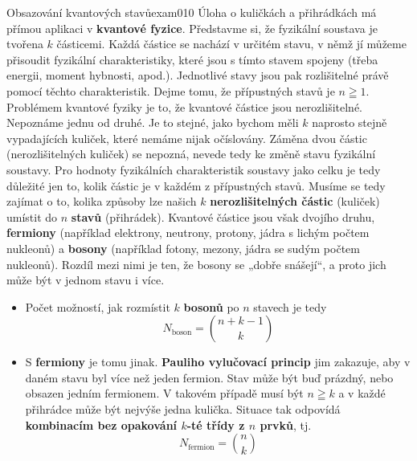 \begin{mathexam}{Obsazování kvantových stavů}{exam010}
  Úloha o kuličkách a přihrádkách má přímou aplikaci v \textbf{kvantové fyzice}. Představme si, že
  fyzikální soustava je tvořena \(k\) částicemi. Každá částice se nachází v určitém stavu, v němž jí
  můžeme přisoudit fyzikální charakteristiky, které jsou s tímto stavem spojeny (třeba energii,
  moment hybnosti, apod.). Jednotlivé stavy jsou pak rozlišitelné právě pomocí těchto
  charakteristik. Dejme tomu, že přípustných stavů je \(n \geqq 1\). Problémem kvantové fyziky je
  to, že kvantové částice jsou nerozlišitelné. Nepoznáme jednu od druhé. Je to stejné, jako bychom
  měli \(k\) naprosto stejně vypadajících kuliček, které nemáme nijak očíslovány. Záměna dvou částic
  (nerozlišitelných kuliček) se nepozná, nevede tedy ke změně stavu fyzikální soustavy. Pro hodnoty
  fyzikálních charakteristik soustavy jako celku je tedy důležité jen to, kolik částic je v každém z
  přípustných stavů. Musíme se tedy zajímat o to, kolika způsoby lze našich \(k\)
  \textbf{nerozlišitelných částic} (kuliček) umístit do \(n\) \textbf{stavů} (přihrádek). Kvantové
  částice jsou však dvojího druhu, \textbf{fermiony} (například elektrony, neutrony, protony, jádra
  s lichým počtem nukleonů) a \textbf{bosony} (například fotony, mezony, jádra se sudým počtem
  nukleonů). Rozdíl mezi nimi je ten, že bosony se „dobře snášejí“, a proto jich může být v jednom
  stavu i více. 
  \begin{itemize}[noitemsep]
    \item Počet možností, jak rozmístit \(k\) \textbf{bosonů} po \(n\) stavech je tedy
          \begin{equation*}
            N_{\text{boson}} = \binom{ n + k - 1}{k}
          \end{equation*}
    \item S \textbf{fermiony} je tomu jinak. \textbf{Pauliho vylučovací princip} jim zakazuje, aby v
          daném stavu byl více než jeden fermion. Stav může být buď prázdný, nebo obsazen jedním
          fermionem. V takovém případě musí být \(n \geqq k\) a v každé přihrádce může být nejvýše
          jedna kulička. Situace tak odpovídá \textbf{kombinacím bez opakování \(k\)-té třídy z
          \(n\) prvků}, tj.
          \begin{equation*}
            N_{\text{fermion}} = \binom{n}{k}
          \end{equation*}
  \end{itemize}
\end{mathexam}